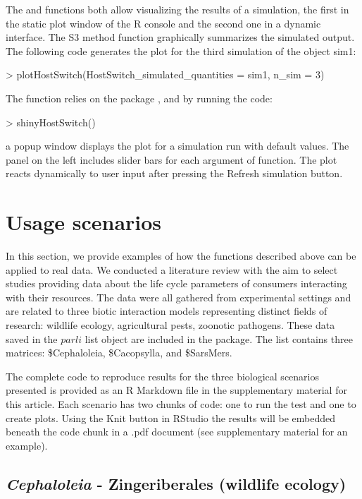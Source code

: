 The  and  functions both allow visualizing the results of a simulation, the first in the static plot window of the R console and the second one in a dynamic interface.
The S3 method  function graphically summarizes the simulated output. The following code generates the plot for the third simulation of the object sim1:
\begin{example}
  > plotHostSwitch(HostSwitch_simulated_quantities = sim1, n_sim = 3)
\end{example}

The function  relies on the package , and by running the code:
\begin{example}
  > shinyHostSwitch()
\end{example}
a popup window displays the plot for a simulation run with default values. The panel on the left includes slider bars for each argument of  function. The plot reacts dynamically to user input after pressing the Refresh simulation button. 

\section{Usage scenarios}
In this section, we provide examples of how the functions described above can be applied to real data. We conducted a literature review with the aim to select studies providing data about the life cycle parameters of consumers interacting with their resources. The data were all gathered from experimental settings and are related to three biotic interaction models representing distinct fields of research: wildlife ecology, agricultural pests, zoonotic pathogens.
These data saved in the $parli$ list object are included in the  package. The list contains three matrices: \$Cephaloleia, \$Cacopsylla, and \$SarsMers.

The complete code to reproduce results for the three biological scenarios presented is provided as an R Markdown file in the supplementary material for this article. Each scenario has two chunks of code: one to run the test and one to create plots. Using the Knit button in RStudio the results will be embedded beneath the code chunk in a .pdf document (see supplementary material for an example).

\subsection{\textit{Cephaloleia} - Zingeriberales (wildlife ecology)}

